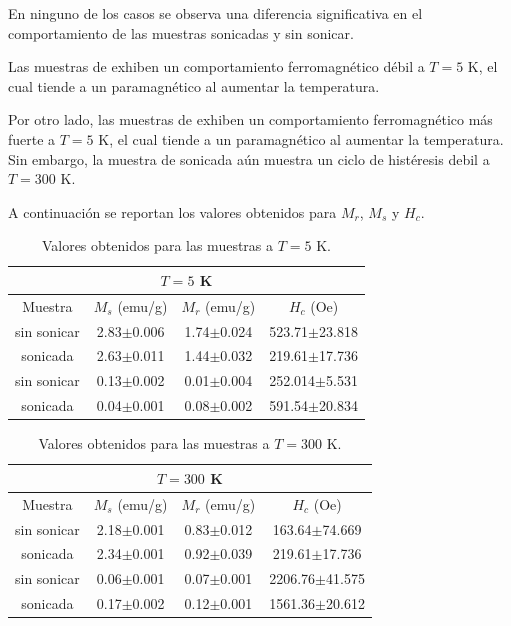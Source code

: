 \documentclass[../main.tex]{subfiles}
\begin{document}
En ninguno de los casos se observa una diferencia significativa en el comportamiento de las muestras sonicadas y sin sonicar.

Las muestras de \neod{} exhiben un comportamiento ferromagnético débil a $T=5$ K, el cual tiende a un paramagnético al aumentar la temperatura.

Por otro lado, las muestras de \sama{} exhiben un comportamiento ferromagnético más fuerte a $T=5$ K, el cual tiende a un paramagnético al aumentar la temperatura. Sin embargo, la muestra de \sama{} sonicada aún muestra un ciclo de histéresis debil a $T=300$ K.

A continuación se reportan los valores obtenidos para $M_r$, $M_s$ y $H_c$.
\begin{table}[H]
    \centering
    \begin{tabular}{|c||c|c|c|}
        \hline
        \multicolumn{4}{|c|}{$T=5$ K} \\
        \hline 
        Muestra & $M_s$ (emu/g) & $M_r$ (emu/g) & $H_c$ (Oe) \\
        \hline
        \hline
        \neod{} sin sonicar & 2.83$\pm$0.006 & 1.74$\pm$0.024 & 523.71$\pm$23.818 \\
        \hline
        \neod{} sonicada & 2.63$\pm$0.011 & 1.44$\pm$0.032 & 219.61$\pm$17.736 \\
        \hline
        \sama{} sin sonicar & 0.13$\pm$0.002 & 0.01$\pm$0.004 & 252.014$\pm$5.531 \\
        \hline
        \sama{} sonicada & 0.04$\pm$0.001 & 0.08$\pm$0.002 & 591.54$\pm$20.834 \\
        \hline
        \end{tabular} 
    \caption{Valores obtenidos para las muestras a $T= 5$ K.}
    \label{tabla:mvh5k}
\end{table}
\begin{table}[H]
    \centering
    \begin{tabular}{|c||c|c|c|}
        \hline
        \multicolumn{4}{|c|}{$T=300$ K} \\
        \hline
        Muestra & $M_s$ (emu/g) & $M_r$ (emu/g) & $H_c$ (Oe) \\
        \hline
        \hline
        \neod{} sin sonicar & 2.18$\pm$0.001 & 0.83$\pm$0.012 & 163.64$\pm$74.669 \\
        \hline
        \neod{} sonicada & 2.34$\pm$0.001 & 0.92$\pm$0.039 & 219.61$\pm$17.736 \\
        \hline
        \sama{} sin sonicar & 0.06$\pm$0.001 & 0.07$\pm$0.001 & 2206.76$\pm$41.575 \\
        \hline
        \sama{} sonicada & 0.17$\pm$0.002 & 0.12$\pm$0.001 & 1561.36$\pm$20.612 \\
        \hline
        \end{tabular} 
    \caption{Valores obtenidos para las muestras a $T= 300$ K.}
    \label{tabla:mvh300k}
\end{table}
\end{document}
